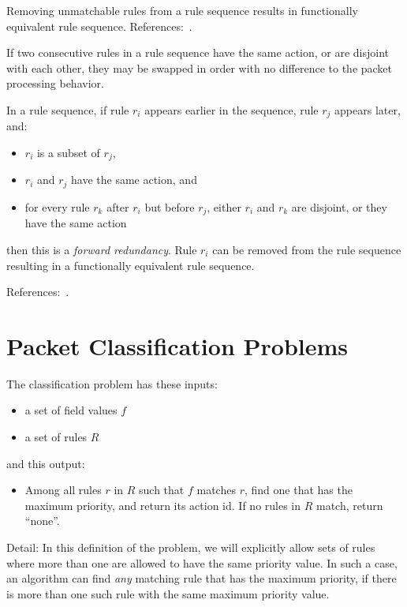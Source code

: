 \documentclass[acmsmall]{acmart}
\begin{document}
Removing unmatchable rules from a rule sequence
results in functionally equivalent rule sequence.
References:~\cite[Sec 2.1]{GM1999a}.

If two consecutive rules in a rule sequence have the same action,
or are disjoint with each other,
they may be swapped in order with no difference to the packet processing behavior.

\begin{definition}
\label{defn:forward-redundant}
In a rule sequence, if rule $r_i$ appears earlier in the sequence,
rule $r_j$ appears later,
and:
\begin{itemize}
\item $r_i$ is a subset of $r_j$,
\item $r_i$ and $r_j$ have the same action, and
\item for every rule $r_k$ after $r_i$ but before $r_j$,
either $r_i$ and $r_k$ are disjoint, or they have the same action
\end{itemize}
then this is a {\em forward redundancy}.
Rule $r_i$ can be removed from the rule sequence
resulting in a functionally equivalent rule sequence.
\end{definition}

References:~\cite[Sec 2.1]{GM1999a}.


\section{Packet Classification Problems}

The classification problem has these inputs:

\begin{itemize}
\item a set of field values $f$
\item a set of rules $R$
\end{itemize}

and this output:

\begin{itemize}
\item Among all rules $r$ in $R$ such that $f$ matches $r$, find one that has the
  maximum priority, and return its action id.  If no rules in $R$ match, return ``none''.
\end{itemize}

Detail: In this definition of the problem, we will explicitly allow
sets of rules where more than one are allowed to have the same
priority value.  In such a case, an algorithm can find {\em any} matching
rule that has the maximum priority, if there is more than one such
rule with the same maximum priority value.
\end{document}
